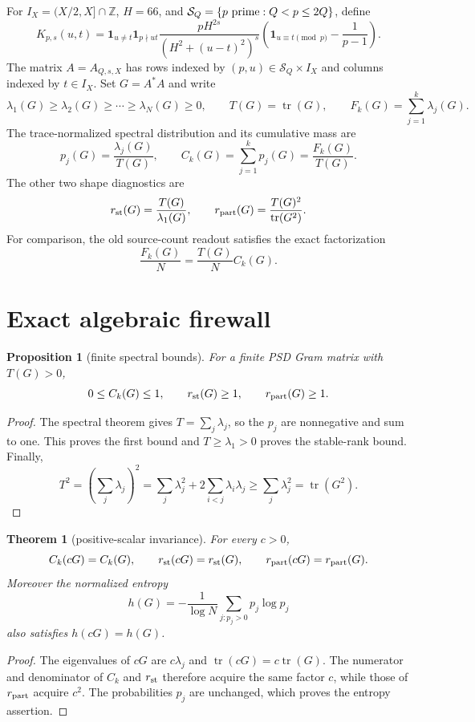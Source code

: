 \documentclass[10pt]{article}
\newtheorem{theorem}{Theorem}
\newtheorem{proposition}{Proposition}
\newcommand{\tr}{\operatorname{tr}}
\begin{document}
For $I_X=(X/2,X]\cap\mathbb Z$, $H=66$, and
$\mathcal S_Q=\{p\ {\rm prime}:Q<p\leq2Q\}$, define
\begin{equation}
 K_{p,s}(u,t)=\mathbf 1_{u\ne t}\mathbf 1_{p\nmid ut}
 \frac{pH^{2s}}{(H^2+(u-t)^2)^s}
 \left(\mathbf 1_{u\equiv t\pmod p}-\frac{1}{p-1}\right).
 \label{eq:kernel}
\end{equation}
The matrix $A=A_{Q,s,X}$ has rows indexed by $(p,u)\in
\mathcal S_Q\times I_X$ and columns indexed by $t\in I_X$.  Set
$G=A^*A$ and write
\[
 \lambda_1(G)\geq\lambda_2(G)\geq\cdots\geq\lambda_N(G)\geq0,\qquad
 T(G)=\tr(G),\qquad F_k(G)=\sum_{j=1}^k\lambda_j(G).
\]
The trace-normalized spectral distribution and its cumulative mass are
\[
 p_j(G)=\frac{\lambda_j(G)}{T(G)},\qquad
 C_k(G)=\sum_{j=1}^k p_j(G)=\frac{F_k(G)}{T(G)}.
 \label{eq:readout}
\]
The other two shape diagnostics are
\[
 r_{\rm st}(G)=\frac{T(G)}{\lambda_1(G)},\qquad
 r_{\rm part}(G)=\frac{T(G)^2}{\tr(G^2)}.
 \label{eq:ranks}
\]
For comparison, the old source-count readout satisfies the exact factorization
\[
 \frac{F_k(G)}{N}=\frac{T(G)}{N}C_k(G).
 \label{eq:sourcefactor}
\]

\section{Exact algebraic firewall}

\begin{proposition}[finite spectral bounds]
For a finite PSD Gram matrix with $T(G)>0$,
\[
 0\leq C_k(G)\leq1,\qquad r_{\rm st}(G)\geq1,\qquad
 r_{\rm part}(G)\geq1.
\]
\end{proposition}
\begin{proof}
The spectral theorem gives $T=\sum_j\lambda_j$, so the $p_j$ are
nonnegative and sum to one.  This proves the first bound and
$T\geq\lambda_1>0$ proves the stable-rank bound.  Finally,
\[
 T^2=\left(\sum_j\lambda_j\right)^2
 =\sum_j\lambda_j^2+2\sum_{i<j}\lambda_i\lambda_j
 \geq\sum_j\lambda_j^2=\tr(G^2).
\]
\end{proof}

\begin{theorem}[positive-scalar invariance]
For every $c>0$,
\[
 C_k(cG)=C_k(G),\qquad r_{\rm st}(cG)=r_{\rm st}(G),\qquad
 r_{\rm part}(cG)=r_{\rm part}(G).
\]
Moreover the normalized entropy
\[
 h(G)=-\frac{1}{\log N}\sum_{j:p_j>0}p_j\log p_j
\]
also satisfies $h(cG)=h(G)$.
\end{theorem}
\begin{proof}
The eigenvalues of $cG$ are $c\lambda_j$ and
$\tr(cG)=c\tr(G)$.  The numerator and denominator of $C_k$ and
$r_{\rm st}$ therefore acquire the same factor $c$, while those of
$r_{\rm part}$ acquire $c^2$.  The probabilities $p_j$ are unchanged,
which proves the entropy assertion.
\end{proof}
\end{document}
